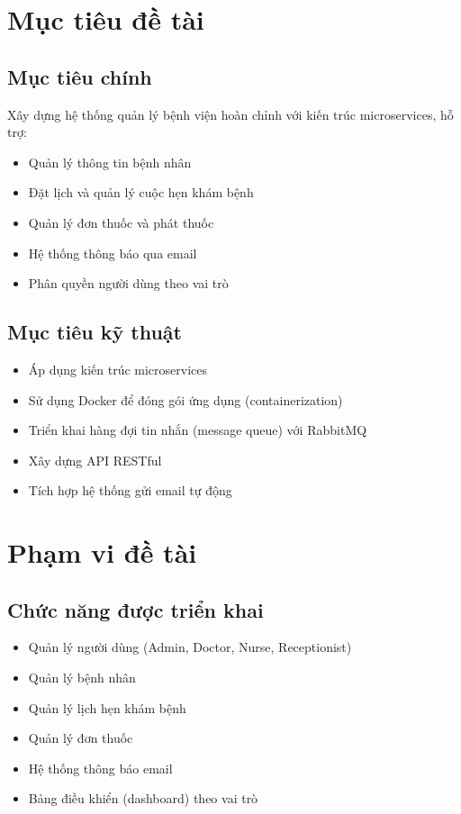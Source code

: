 \documentclass[12pt,a4paper]{report}
\begin{document}
\section{Mục tiêu đề tài}
\subsection{Mục tiêu chính}
Xây dựng hệ thống quản lý bệnh viện hoàn chỉnh với kiến trúc microservices, hỗ trợ:
\begin{itemize}
    \item Quản lý thông tin bệnh nhân
    \item Đặt lịch và quản lý cuộc hẹn khám bệnh
    \item Quản lý đơn thuốc và phát thuốc
    \item Hệ thống thông báo qua email
    \item Phân quyền người dùng theo vai trò
\end{itemize}

\subsection{Mục tiêu kỹ thuật}
\begin{itemize}
    \item Áp dụng kiến trúc microservices
    \item Sử dụng Docker để đóng gói ứng dụng (containerization)
    \item Triển khai hàng đợi tin nhắn (message queue) với RabbitMQ
    \item Xây dựng API RESTful
    \item Tích hợp hệ thống gửi email tự động
\end{itemize}

\section{Phạm vi đề tài}
\subsection{Chức năng được triển khai}
\begin{itemize}
    \item Quản lý người dùng (Admin, Doctor, Nurse, Receptionist)
    \item Quản lý bệnh nhân
    \item Quản lý lịch hẹn khám bệnh
    \item Quản lý đơn thuốc
    \item Hệ thống thông báo email
    \item Bảng điều khiển (dashboard) theo vai trò
\end{itemize}
\end{document}
